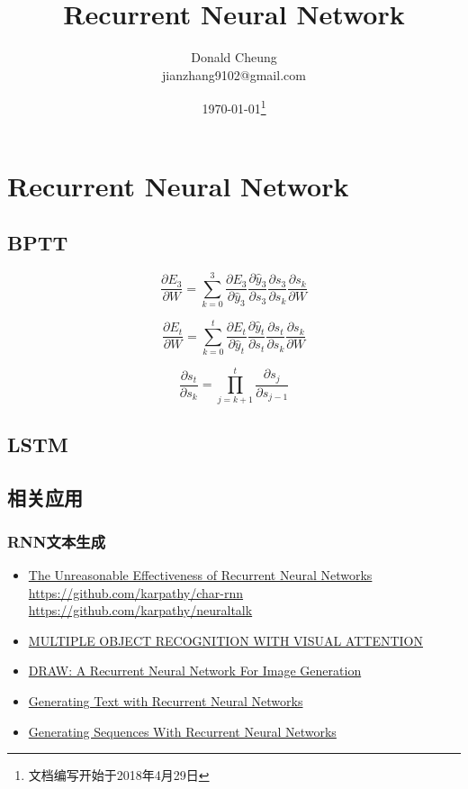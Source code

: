 \ifx\mlnotes\undefined
    \providecommand{\notesroot}{../..}
    \providecommand{\rnnroot}{.}

    \title{Recurrent Neural Network}
    \author{Donald Cheung\\jianzhang9102@gmail.com}
    \date{\today\footnote{文档编写开始于2018年4月29日}}

    
\else
    \providecommand{\rnnroot}{\mlroot/rnn}
\fi

\chapter{Recurrent Neural Network}

\section{BPTT}
\[
    \frac{\partial E_3}{\partial W}=\sum_{k=0}^{3}{
        \frac{\partial E_3}{\partial \hat{y}_3}
        \frac{\partial \hat{y}_3}{\partial s_3}
        \frac{\partial s_3}{\partial s_k}
        \frac{\partial s_k}{\partial W}
    }
\]

\[
    \frac{\partial E_t}{\partial W}=\sum_{k=0}^{t}{
        \frac{\partial E_t}{\partial \hat{y}_t}
        \frac{\partial \hat{y}_t}{\partial s_t}
        \frac{\partial s_t}{\partial s_k}
        \frac{\partial s_k}{\partial W}
    }
\]

\[
    \frac{\partial s_t}{\partial s_k}=\prod_{j=k+1}^{t} \frac{\partial s_j}{\partial s_{j-1}}
\]

\section{LSTM}



\section{相关应用}

\subsection{RNN文本生成}
\begin{itemize}
    \item \href{https://karpathy.github.io/2015/05/21/rnn-effectiveness/}{The Unreasonable Effectiveness of Recurrent Neural Networks}
        \subitem \url{https://github.com/karpathy/char-rnn}
        \subitem \url{https://github.com/karpathy/neuraltalk}
    \item \href{https://arxiv.org/abs/1412.7755}{MULTIPLE OBJECT RECOGNITION WITH VISUAL ATTENTION}
    \item \href{https://arxiv.org/abs/1502.04623}{DRAW: A Recurrent Neural Network For Image Generation}
    \item \href{http://www.cs.utoronto.ca/~ilya/pubs/2011/LANG-RNN.pdf}{Generating Text with Recurrent Neural Networks}
\item \href{https://arxiv.org/abs/1308.0850}{Generating Sequences With Recurrent Neural Networks}
\end{itemize}


